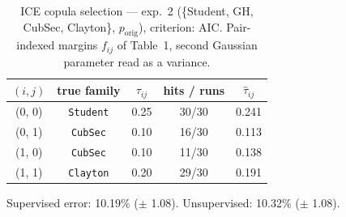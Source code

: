 \begin{table}[htbp]
  \centering
  \caption{ICE copula selection — exp.\ 2 (\{Student, GH, CubSec, Clayton\}, $p_{\text{orig}}$), criterion: AIC. Pair-indexed margins $f_{ij}$ of Table~1, second Gaussian parameter read as a variance.}
  \label{tab:exp3-exp2_orig_p__aic}
  \begin{tabular}{ccccc}
    \toprule
    $(i, j)$ & true family & $\tau_{ij}$ & hits / runs & $\hat\tau_{ij}$ \\
    \midrule
    (0, 0) & \texttt{Student} & 0.25 & 30/30 & 0.241 \\
    (0, 1) & \texttt{CubSec} & 0.10 & 16/30 & 0.113 \\
    (1, 0) & \texttt{CubSec} & 0.10 & 11/30 & 0.138 \\
    (1, 1) & \texttt{Clayton} & 0.20 & 29/30 & 0.191 \\
    \bottomrule
  \end{tabular}
  \par\smallskip Supervised error: 10.19\% ($\pm$ 1.08). Unsupervised: 10.32\% ($\pm$ 1.08).
\end{table}
